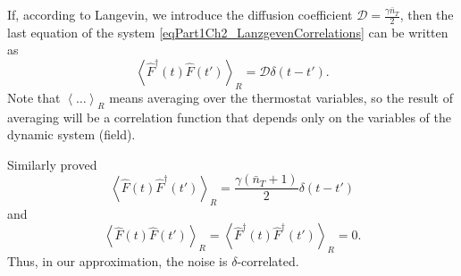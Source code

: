 If, according to Langevin, we introduce the diffusion coefficient $\mathcal{D} =
\frac{\gamma \bar{n}_{T}}{2}$, then the last equation of the system
\eqref{eqPart1Ch2_LanzgevenCorrelations} can be written as
\begin{equation}
\left<\hat{F}^{\dag}\left(t\right)\hat{F}\left(t'\right)\right>_R = 
\mathcal{D} \delta\left(t - t'\right). 
\nonumber
\end{equation}
Note that $\left<\dots\right>_R$ means averaging over the thermostat variables, so the result of averaging will be a correlation function that depends only on the variables of the dynamic system (field).

Similarly proved
\begin{equation}
\left<\hat{F}\left(t\right)\hat{F}^{\dag}\left(t'\right)\right>_R = 
\frac{\gamma\left(\bar{n}_{T} + 1\right)}{2} \delta\left(t - t'\right)
\label{eqPart1Ch2_Lanzgeven_Task1}
\end{equation}
and
\begin{equation}
\left<\hat{F}\left(t\right)\hat{F}\left(t'\right)\right>_R = 
\left<\hat{F}^{\dag}\left(t\right)\hat{F}^{\dag}\left(t'\right)\right>_R = 0.
\label{eqPart1Ch2_Lanzgeven_Task2}
\end{equation}
Thus, in our approximation, the noise is 
$\delta$-correlated.

